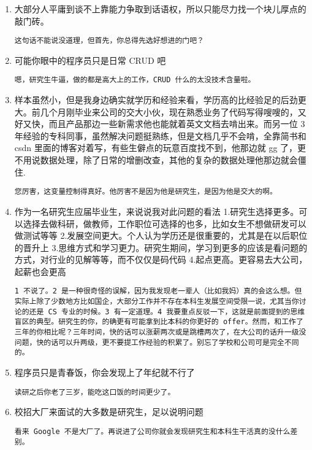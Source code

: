 \documentclass[cn,11pt]{elegantbook}
\begin{document}
\begin{enumerate}
\item 大部分人平庸到谈不上靠能力争取到话语权，所以只能尽力找一个块儿厚点的敲门砖。

\begin{lstlisting}
这句话不能说没道理，但首先，你总得先选好想进的门吧？
\end{lstlisting}

\item 可能你眼中的程序员只是日常 CRUD 吧

\begin{lstlisting}
嗯，研究生牛逼，做的都是高大上的工作，CRUD 什么的太没技术含量啦。
\end{lstlisting}

\item 样本虽然小，但是我身边确实就学历和经验来看，学历高的比经验足的后劲更大。前几个月刚毕业来公司的交大小伙，现在熟悉业务了代码写得嗖嗖的，又好又快，而且产品那边一些新需求他也能就着英文文档去啃出来。而另一位 3 年经验的专科同事，虽然解决问题挺熟练，但是文档几乎不会啃，全靠简书和 csdn 里面的博客对着写，有些生僻点的玩意百度找不到，他那边就 gg 了，更不用说数据处理，除了日常的增删改查，其他的复杂的数据处理他那边就会僵住.

\begin{lstlisting}
您厉害，这变量控制得真好。他厉害不是因为他是研究生，是因为他是交大的啊。
\end{lstlisting}

\item 作为一名研究生应届毕业生，来说说我对此问题的看法 1.研究生选择更多。可以选择去做科研，做教师，工作职位可选择的也多，比如女生不想做研发可以做测试等等 2.发展空间更大。个人认为学历还是很重要的，尤其是在以后职位的晋升上 3.思维方式和学习更力。研究生期间，学习到更多的应该是看问题的方式，对行业的见解等等，而不仅仅是码代码 4.起点更高。更容易去大公司，起薪也会更高

\begin{lstlisting}
1 不说了。2 是一种很奇怪的误解，因为我发现老一辈人（比如我妈）真的会这么想。但实际上除了少数地方比如国企，大部分工作并不存在本科生发展空间受限一说，尤其当你讨论的还是 CS 专业的时候。3 有一定道理。4 我要重点反驳一下，这就是前面提到的思维盲区的典型。研究生的你，的确更有可能拿到比本科的你更好的 offer。然而，和工作了三年的你相比呢？三年时间，快的话可以涨薪两次或是跳槽两次了，在大公司的话升一级没问题，快的话可以升两级，更不要提工作经验的积累了。别忘了学校和公司可是完全不同的。
\end{lstlisting}

\item 程序员只是青春饭，你会发现上了年纪就不行了

\begin{lstlisting}
读研之后你老了三岁，能吃这口饭的时间更少了。
\end{lstlisting}

\item 校招大厂来面试的大多数是研究生，足以说明问题

\begin{lstlisting}
看来 Google 不是大厂了。再说进了公司你就会发现研究生和本科生干活真的没什么差别。
\end{lstlisting}
	
\end{enumerate}	
\end{document}
